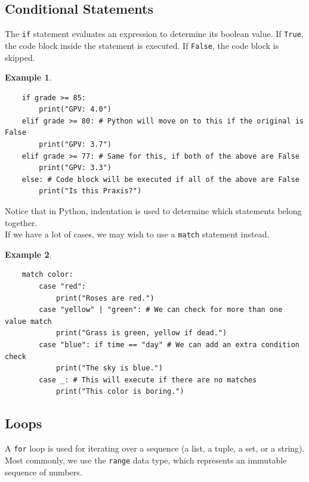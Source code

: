 \documentclass[11pt]{scrartcl}
\theoremstyle{definition}
\newtheorem*{example}{Example}
\begin{document}
\subsection{Conditional Statements}

The \texttt{if} statement evaluates an expression to determine its boolean value. If 
\texttt{True}, the code block inside the statement is executed. If \texttt{False}, the 
code block is skipped.

\begin{example}
    \
\begin{verbatim}
    if grade >= 85:
        print("GPV: 4.0")
    elif grade >= 80: # Python will move on to this if the original is False
        print("GPV: 3.7")
    elif grade >= 77: # Same for this, if both of the above are False
        print("GPV: 3.3")
    else: # Code block will be executed if all of the above are False
        print("Is this Praxis?")
\end{verbatim}
\end{example}

Notice that in Python, indentation is used to determine which statements belong together. \\[-0.5em]

If we have a lot of cases, we may wish to use a \texttt{match} statement instead.

\begin{example}
    \
\begin{verbatim}
    match color:
        case "red":
            print("Roses are red.")
        case "yellow" | "green": # We can check for more than one value match
            print("Grass is green, yellow if dead.")
        case "blue": if time == "day" # We can add an extra condition check
            print("The sky is blue.")
        case _: # This will execute if there are no matches
            print("This color is boring.")
\end{verbatim}
\end{example}

\subsection{Loops}

A \texttt{for} loop is used for iterating over a sequence (a list, a tuple, a set, or a string).
Most commonly, we use the \texttt{range} data type, which represents an immutable sequence of 
numbers.
\end{document}
